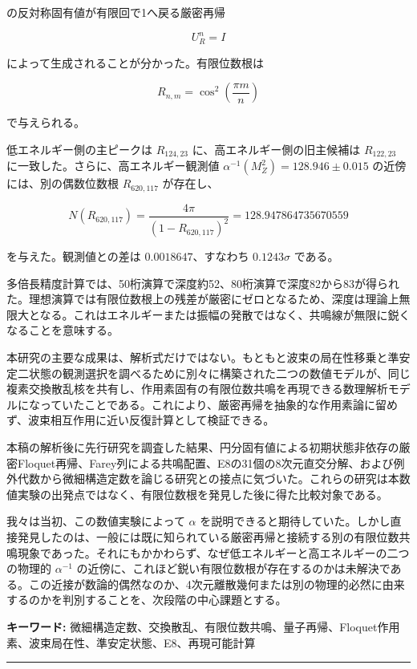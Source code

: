 \documentclass[
  10pt,
  a4paper,
]{article}
\begin{document}
の反対称固有値が有限回で1へ戻る厳密再帰

\[
U_R^n=I
\]

によって生成されることが分かった。有限位数根は

\[
\boxed{
R_{n,m}=\cos^2\left(\frac{\pi m}{n}\right)
}
\]

で与えられる。

低エネルギー側の主ピークは \(R_{124,23}\) に、高エネルギー側の旧主候補は
\(R_{122,23}\) に一致した。さらに、高エネルギー観測値
\(\alpha^{-1}(M_Z^2)=128.946\pm0.015\) の近傍には、別の偶数位数根
\(R_{620,117}\) が存在し、

\[
N(R_{620,117})
=\frac{4\pi}{(1-R_{620,117})^2}
=128.947864735670559
\]

を与えた。観測値との差は \(0.0018647\)、すなわち \(0.1243\sigma\)
である。

多倍長精度計算では、50桁演算で深度約52、80桁演算で深度82から83が得られた。理想演算では有限位数根上の残差が厳密にゼロとなるため、深度は理論上無限大となる。これはエネルギーまたは振幅の発散ではなく、共鳴線が無限に鋭くなることを意味する。

本研究の主要な成果は、解析式だけではない。もともと波束の局在性移乗と準安定二状態の観測選択を調べるために別々に構築された二つの数値モデルが、同じ複素交換散乱核を共有し、作用素固有の有限位数共鳴を再現できる数理解析モデルになっていたことである。これにより、厳密再帰を抽象的な作用素論に留めず、波束相互作用に近い反復計算として検証できる。

本稿の解析後に先行研究を調査した結果、円分固有値による初期状態非依存の厳密Floquet再帰、Farey列による共鳴配置、E8の31個の8次元直交分解、および例外代数から微細構造定数を論じる研究との接点に気づいた。これらの研究は本数値実験の出発点ではなく、有限位数根を発見した後に得た比較対象である。

我々は当初、この数値実験によって \(\alpha\)
を説明できると期待していた。しかし直接発見したのは、一般には既に知られている厳密再帰と接続する別の有限位数共鳴現象であった。それにもかかわらず、なぜ低エネルギーと高エネルギーの二つの物理的
\(\alpha^{-1}\)
の近傍に、これほど鋭い有限位数根が存在するのかは未解決である。この近接が数論的偶然なのか、4次元離散幾何または別の物理的必然に由来するのかを判別することを、次段階の中心課題とする。

\textbf{キーワード:}
微細構造定数、交換散乱、有限位数共鳴、量子再帰、Floquet作用素、波束局在性、準安定状態、E8、再現可能計算

\begin{center}\rule{0.5\linewidth}{0.5pt}\end{center}
\end{document}
